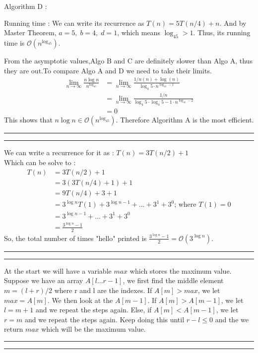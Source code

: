 \documentclass[a4paper, 12pt]{article}
\newcommand{\question}[1] {\vspace{.25in} \hrule\vspace{0.5em}
	\noindent{\bf #1} \vspace{0.5em}
	\hrule \vspace{.10in}}
\begin{document}
Algorithm D :

Running time : We can write its recurrence as $T(n) = 5T(n/4) + n$. And by Master Theorem, $a = 5,\; b =4, \; d=1 $, which means $\log_45 > 1 $. Thus, its running time is $\mathcal{O}(n^{\log_45})$.

From the asymptotic values,Algo B and C are definitely slower than Algo A, thus they are out.To compare Algo A and D we need to take their limits.
\begin{align*}
	\lim\limits_{n\to\infty}\frac{n \log n }{n^{\log_45}} 
	&= \lim\limits_{n\to\infty} \frac{1/n(n) + \log(n)}{\log_4{5} \cdot n^{\log_45 -1}}\\
	&= \lim\limits_{n\to\infty} \frac{1/n}{\log_4{5} \cdot \log_4{5} -1 \cdot n^{\log_45 -2}}\\
	&= 0
\end{align*}
This shows that $n\log n\in \mathcal{O}(n^{\log_45})$. Therefore Algorithm A is the most efficient.

\question{Problem 3}
We can write a recurrence for it as : $T(n) = 3T(n/2) + 1$\\
Which can be solve to :
\begin{align*}
	T(n) &= 3T(n/2) + 1\\
	&= 3(3T(n/4)+1) + 1\\
	&= 9T(n/4) +3 +1\\
	&= 3^{\log n} T(1) + 3^{\log n -1} + ... + 3^1 +3^0 \text{; where } T(1) = 0\\
	&= 3^{\log n -1} + ... + 3^1 +3^0\\
	&= \frac{3^{\log n}-1}{2}
\end{align*}
So, the total number of times "hello" printed  is $\frac{3^{\log n}-1}{2} = \mathcal{O}(3^{\log n})$.
\question{Problem 4}
 
 At the start we will have a variable $max$ which stores the maximum value. Suppose we have an array $A[l...r-1]$, we first find the middle element $m = (l+r)/2$ where r and l are the indexes. If $A[m] > max$, we let $max = A[m]$. We then look at the $A[m-1]$. If $A[m] > A[m-1]$, we let $l = m+1$ and we repeat the steps again. Else, if $A[m] < A[m-1]$, we let $r = m$ and we repeat the steps again. Keep doing this until $r-l \leqslant 0 $ and the we return $max$ which will be the maximum value.
 
 \question{Problem 5}
 
\end{document}
